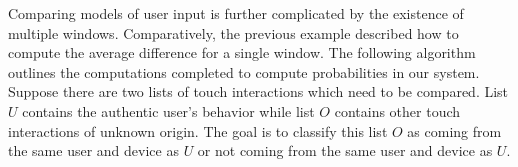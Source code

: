 %
Comparing models of user input 
is further complicated by the existence of
multiple windows.
Comparatively, the previous example described how
to compute the average difference for a single window.
%
The following algorithm outlines
the computations completed to compute probabilities in our system.
Suppose there are two lists of touch interactions which need to 
be compared.
List $U$ contains the authentic user's behavior while
list $O$ contains other touch interactions of unknown origin.
The goal is to classify this list $O$ as 
coming from the same user and device as $U$ or
not coming from the same user and device as $U$.
